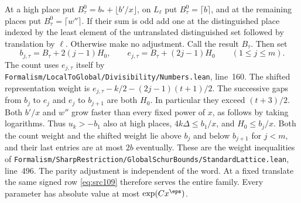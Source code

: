 \documentclass[a4paper,11pt]{article}
\theoremstyle{definition}
\theoremstyle{remark}
\newcommand{\srcloc}[2]{{\small\nolinkurl{#1.lean}}, line~#2}
\numberwithin{equation}{section}
\begin{document}
At a high place put \(B_\tau^0=b_*+\lfloor b'/x\rfloor\), on
\(L_\ell\) put \(B_\tau^0=\lceil b\rceil\), and at the remaining
places put \(B_\tau^0=\lceil w''\rceil\). If their sum is odd
add one at the distinguished place indexed by the least element
of the untranslated distinguished set followed by translation by
\(\ell\). Otherwise make no adjustment. Call the result \(B_\tau\).
Then set
\[
 b_{j,\tau}=B_\tau+2(j-1)H_0,\qquad
 e_{j,\tau}=B_\tau+(2j-1)H_0\qquad(1\le j\le m).
\]
The count uses \(e_{j,\tau}\) itself by
\srcloc{Formalism/LocalToGlobal/Divisibility/Numbers}{160}.
The shifted representation weight is \(e_{j,\tau}-k/2-(2j-1)(t+1)/2\).
The successive gaps from \(b_j\) to \(e_j\) and \(e_j\) to
\(b_{j+1}\) are both \(H_0\). In particular they exceed
\((t+3)/2\). Both \(b'/x\) and \(w''\) grow faster than every
fixed power of \(x\), as follows by taking logarithms. Thus
\(u_k>-b_1\) also at high places, \(4k\Delta\le b_1/x\),
and \(H_0\le b_j/x\). Both the count weight and the shifted
weight lie above \(b_j\) and below \(b_{j+1}\) for \(j<m\),
and their last entries are at most \(2b\) eventually. These are
the weight inequalities of
\srcloc{Formalism/SharpRestriction/GlobalSchurBounds/StandardLattice}{496}.
The parity adjustment is independent of the word. At a fixed
translate the same signed row \eqref{eq:src109} therefore serves
the entire family. Every parameter has absolute value at most
\(\exp(Cx^\eps)\).
\end{document}
